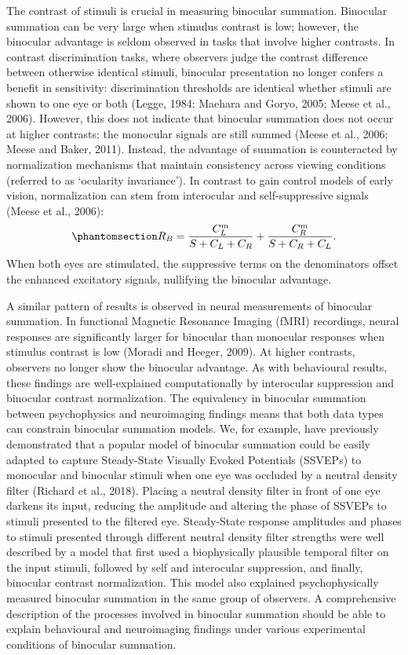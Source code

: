 \documentclass[
  12pt,
]{article}
\begin{document}
The contrast of stimuli is crucial in measuring binocular summation.
Binocular summation can be very large when stimulus contrast is low;
however, the binocular advantage is seldom observed in tasks that
involve higher contrasts. In contrast discrimination tasks, where
observers judge the contrast difference between otherwise identical
stimuli, binocular presentation no longer confers a benefit in
sensitivity: discrimination thresholds are identical whether stimuli are
shown to one eye or both (Legge, 1984; Maehara and Goryo, 2005; Meese et
al., 2006). However, this does not indicate that binocular summation
does not occur at higher contrasts; the monocular signals are still
summed (Meese et al., 2006; Meese and Baker, 2011). Instead, the
advantage of summation is counteracted by normalization mechanisms that
maintain consistency across viewing conditions (referred to as
`ocularity invariance'). In contrast to gain control models of early
vision, normalization can stem from interocular and self-suppressive
signals (Meese et al., 2006):
\begin{equation}\phantomsection\label{eq-intoMath2}{
R_B = \frac{C_L^m}{S+C_L+C_R} + \frac{C_R^m}{S+C_R+C_L}.
}\end{equation} When both eyes are stimulated, the suppressive terms on
the denominators offset the enhanced excitatory signals, nullifying the
binocular advantage.

A similar pattern of results is observed in neural measurements of
binocular summation. In functional Magnetic Resonance Imaging (fMRI)
recordings, neural responses are significantly larger for binocular than
monocular responses when stimulus contrast is low (Moradi and Heeger,
2009). At higher contrasts, observers no longer show the binocular
advantage. As with behavioural results, these findings are
well-explained computationally by interocular suppression and binocular
contrast normalization. The equivalency in binocular summation between
psychophysics and neuroimaging findings means that both data types can
constrain binocular summation models. We, for example, have previously
demonstrated that a popular model of binocular summation could be easily
adapted to capture Steady-State Visually Evoked Potentials (SSVEPs) to
monocular and binocular stimuli when one eye was occluded by a neutral
density filter (Richard et al., 2018). Placing a neutral density filter
in front of one eye darkens its input, reducing the amplitude and
altering the phase of SSVEPs to stimuli presented to the filtered eye.
Steady-State response amplitudes and phases to stimuli presented through
different neutral density filter strengths were well described by a
model that first used a biophysically plausible temporal filter on the
input stimuli, followed by self and interocular suppression, and
finally, binocular contrast normalization. This model also explained
psychophysically measured binocular summation in the same group of
observers. A comprehensive description of the processes involved in
binocular summation should be able to explain behavioural and
neuroimaging findings under various experimental conditions of binocular
summation.
\end{document}
